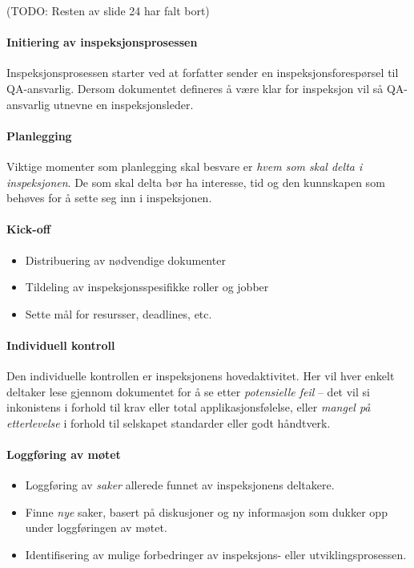 (TODO: Resten av slide 24 har falt bort)

\paragraph{Initiering av inspeksjonsprosessen}

Inspeksjonsprosessen starter ved at forfatter sender en
inspeksjonsforespørsel til QA-ansvarlig. Dersom dokumentet defineres å
være klar for inspeksjon vil så QA-ansvarlig utnevne en
inspeksjonsleder.

\paragraph{Planlegging}

Viktige momenter som planlegging skal besvare er \emph{hvem som skal
delta i inspeksjonen}. De som skal delta bør ha interesse, tid og den
kunnskapen som behøves for å sette seg inn i inspeksjonen.

\paragraph{Kick-off}

\begin{itemize}
\item
  Distribuering av nødvendige dokumenter
\item
  Tildeling av inspeksjonsspesifikke roller og jobber
\item
  Sette mål for resursser, deadlines, etc.
\end{itemize}
\paragraph{Individuell kontroll}

Den individuelle kontrollen er inspeksjonens hovedaktivitet. Her vil
hver enkelt deltaker lese gjennom dokumentet for å se etter
\emph{potensielle feil} -- det vil si inkonistens i forhold til krav
eller total applikasjonsfølelse, eller \emph{mangel på etterlevelse} i
forhold til selskapet standarder eller godt håndtverk.

\paragraph{Loggføring av møtet}

\begin{itemize}
\item
  Loggføring av \emph{saker} allerede funnet av inspeksjonens deltakere.
\item
  Finne \emph{nye} saker, basert på diskusjoner og ny informasjon som
  dukker opp under loggføringen av møtet.
\item
  Identifisering av mulige forbedringer av inspeksjons- eller
  utviklingsprosessen.
\end{itemize}
